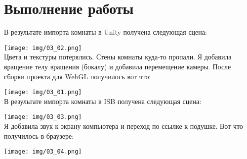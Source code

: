 \section{Выполнение работы}

В результате импорта комнаты в Unity получена следующая сцена:

\texttt{[image: img/03\_02.png]}\\

Цвета и текстуры потерялись. Стены комнаты куда-то пропали. Я добавила вращение телу вращения (бокалу) и добавила перемещение камеры. После сборки проекта для WebGL получилось вот что:

\texttt{[image: img/03\_01.png]}\\

В результате импорта комнаты в ISB получена следующая сцена:

\texttt{[image: img/03\_03.png]}\\

Я добавила звук к экрану компьютера и переход по ссылке к подушке. Вот что получилось в браузере:

\texttt{[image: img/03\_04.png]}\\


\pagebreak

